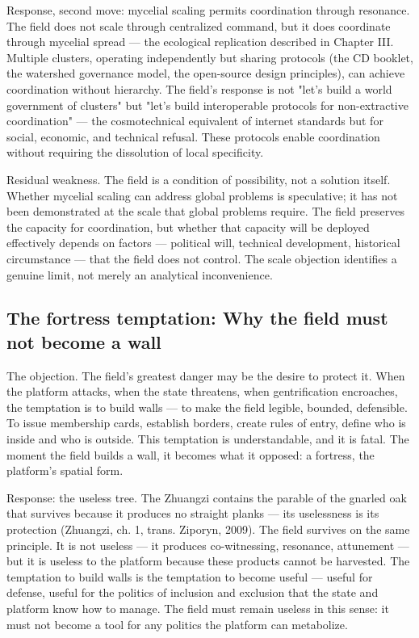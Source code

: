 Response, second move: mycelial scaling permits coordination through resonance. The field does not scale through centralized command, but it does coordinate through mycelial spread — the ecological replication described in Chapter III. Multiple clusters, operating independently but sharing protocols (the CD booklet, the watershed governance model, the open-source design principles), can achieve coordination without hierarchy. The field's response is not "let's build a world government of clusters" but "let's build interoperable protocols for non-extractive coordination" — the cosmotechnical equivalent of internet standards but for social, economic, and technical refusal. These protocols enable coordination without requiring the dissolution of local specificity.

Residual weakness. The field is a condition of possibility, not a solution itself. Whether mycelial scaling can address global problems is speculative; it has not been demonstrated at the scale that global problems require. The field preserves the capacity for coordination, but whether that capacity will be deployed effectively depends on factors — political will, technical development, historical circumstance — that the field does not control. The scale objection identifies a genuine limit, not merely an analytical inconvenience.

\subsection{The fortress temptation: Why the field must not become a wall}

The objection. The field's greatest danger may be the desire to protect it. When the platform attacks, when the state threatens, when gentrification encroaches, the temptation is to build walls — to make the field legible, bounded, defensible. To issue membership cards, establish borders, create rules of entry, define who is inside and who is outside. This temptation is understandable, and it is fatal. The moment the field builds a wall, it becomes what it opposed: a fortress, the platform's spatial form.

Response: the useless tree. The Zhuangzi contains the parable of the gnarled oak that survives because it produces no straight planks — its uselessness is its protection (Zhuangzi, ch. 1, trans. Ziporyn, 2009). The field survives on the same principle. It is not useless — it produces co-witnessing, resonance, attunement — but it is useless to the platform because these products cannot be harvested. The temptation to build walls is the temptation to become useful — useful for defense, useful for the politics of inclusion and exclusion that the state and platform know how to manage. The field must remain useless in this sense: it must not become a tool for any politics the platform can metabolize.

